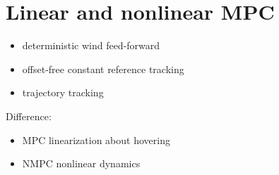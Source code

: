 \ETHslide
\section*{Linear and nonlinear MPC}
\vspace*{\fill}

\begin{itemize}
\item[\ETHitem] deterministic wind feed-forward
\item[\ETHitem] offset-free constant reference tracking
\item[\ETHitem] trajectory tracking
\end{itemize}

Difference:
\begin{itemize}
\item[\ETHitem] MPC linearization about hovering
\item[\ETHitem] NMPC nonlinear dynamics
\end{itemize}

\vspace*{\fill}
\clearpage